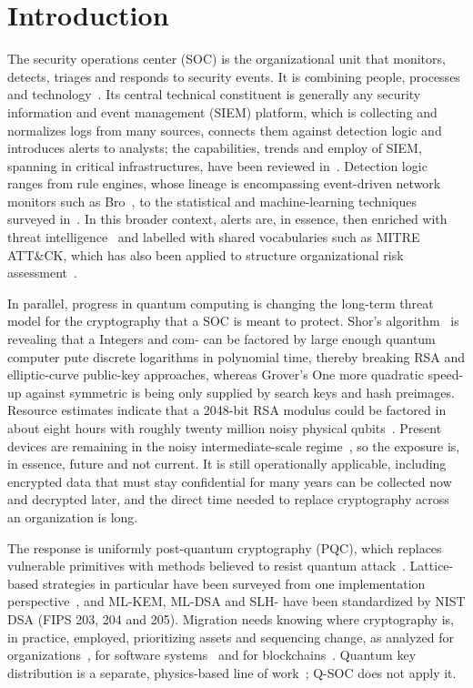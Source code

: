 \documentclass[conference]{IEEEtran}
\begin{document}
\section{Introduction}
The security operations center (SOC) is the organizational unit that monitors, detects, triages and responds to security events. It is combining people, processes and technology~\cite{vielberth2020}. Its central technical constituent is generally any security information and event management (SIEM) platform, which is collecting and normalizes logs from many sources, connects them against detection logic and introduces alerts to analysts; the capabilities, trends and employ of SIEM, spanning in critical infrastructures, have been reviewed in~\cite{gonzalez2021}. Detection logic ranges from rule engines, whose lineage is encompassing event-driven network monitors such as Bro~\cite{paxson1999}, to the statistical and machine-learning techniques surveyed in~\cite{buczak2016,khraisat2019}. In this broader context, alerts are, in essence, then enriched with threat intelligence~\cite{tounsi2018} and labelled with shared vocabularies such as MITRE ATT\&CK, which has also been applied to structure organizational risk assessment~\cite{georgiadou2021}.

In parallel, progress in quantum computing is changing the long-term threat model for the cryptography that a SOC is meant to protect. Shor's algorithm~\cite{shor1997} is revealing that a Integers and com- can be factored by large enough quantum computer pute discrete logarithms in polynomial time, thereby breaking RSA and elliptic-curve public-key approaches, whereas Grover's One more quadratic speed-up against symmetric is being only supplied by search keys and hash preimages. Resource estimates indicate that a 2048-bit RSA modulus could be factored in about eight hours with roughly twenty million noisy physical qubits~\cite{gidney2021}. Present devices are remaining in the noisy intermediate-scale regime~\cite{preskill2018}, so the exposure is, in essence, future and not current. It is still operationally applicable, including encrypted data that must stay confidential for many years can be collected now and decrypted later, and the direct time needed to replace cryptography across an organization is long.

The response is uniformly post-quantum cryptography (PQC), which replaces vulnerable primitives with methods believed to resist quantum attack~\cite{bernstein2017}. Lattice-based strategies in particular have been surveyed from one implementation perspective~\cite{nejatollahi2019}, and ML-KEM, ML-DSA and SLH- have been standardized by NIST DSA (FIPS 203, 204 and 205). Migration needs knowing where cryptography is, in practice, employed, prioritizing assets and sequencing change, as analyzed for organizations~\cite{joseph2022}, for software systems~\cite{nather2024} and for blockchains~\cite{baseri2026}. Quantum key distribution is a separate, physics-based line of work~\cite{gisin2002,pirandola2020}; Q-SOC does not apply it.
\end{document}
